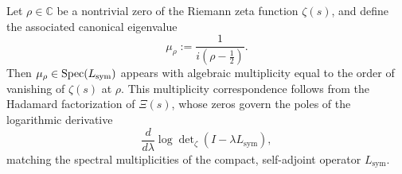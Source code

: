 \begin{lemma}
\label{lem:multiplicity_preservation}
Let \( \rho \in \mathbb{C} \) be a nontrivial zero of the Riemann zeta function \( \zeta(s) \), and define the associated canonical eigenvalue
\[
\mu_\rho := \frac{1}{i(\rho - \tfrac{1}{2})}.
\]
Then \( \mu_\rho \in \operatorname{Spec}(L_{\mathrm{sym}}) \) appears with algebraic multiplicity equal to the order of vanishing of \( \zeta(s) \) at \( \rho \). This multiplicity correspondence follows from the Hadamard factorization of \( \Xi(s) \), whose zeros govern the poles of the logarithmic derivative
\[
\frac{d}{d\lambda} \log \det\nolimits_{\zeta}(I - \lambda L_{\mathrm{sym}}),
\]
matching the spectral multiplicities of the compact, self-adjoint operator \( L_{\mathrm{sym}} \).
\end{lemma}
